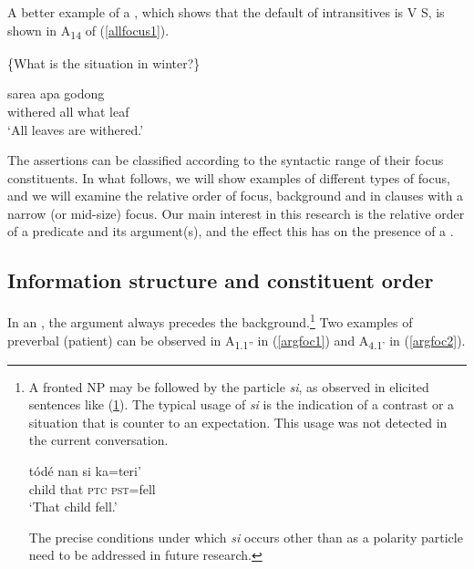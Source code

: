 \documentclass[output=paper
,modfonts
,nonflat]{langsci/langscibook}
\begin{document}
\noindent A better example of a , which shows that the default  of intransitives is V S, is shown in A\textsubscript{{14}} of (\ref{allfocus1}).

\begin{exe}
	\ex\label{allfocus1}
	\begin{xlist}
			\{What is the situation in winter?\} 
	\end{xlist}
	\begin{xlist}[> A\textsubscript{{14}}:]
		\exi{> A\textsubscript{{14}}:}
			sarea	apa	{godong{\cb}\focus{\cb}\sq}\\
		\hphantom{[[}withered	all	what	leaf\\
		\glt `All leaves are withered.'
	\end{xlist}
\end{exe}

\noindent The assertions can be classified according to the syntactic range of their focus constituents. In what follows, we will show examples of different types of focus, and we will examine the relative order of focus, background and  in clauses with a narrow (or mid-size) focus. Our main interest in this research is the relative order of a predicate and its argument(s), and the effect this has on the presence of a . 

\subsection{Information structure and constituent order}\label{sect:isqud}

In an  , the argument always precedes the background.\footnote{A fronted NP may be followed by the  particle \textit{si}, as observed in elicited sentences like (\ref{Ssifell3}). The typical usage of \textit{si} is the indication of a contrast or a situation that is counter to an expectation. This usage was not detected in the current conversation. 
	
	\ea\label{Ssifell3}
	\gll t\'od\'e 	nan	si	ka=teri’\\
	child	that	\textsc{ptc}	\textsc{pst}=fell\\
	\glt `That child fell.’
	\z
	
	\noindent The precise conditions under which \textit{si} occurs other than as a polarity particle need to be addressed in future research.} Two examples of preverbal (patient)  can be observed in A\textsubscript{{1.1''}} in (\ref{argfoc1}) and A\textsubscript{{4.1'}} in (\ref{argfoc2}).
\end{document}
